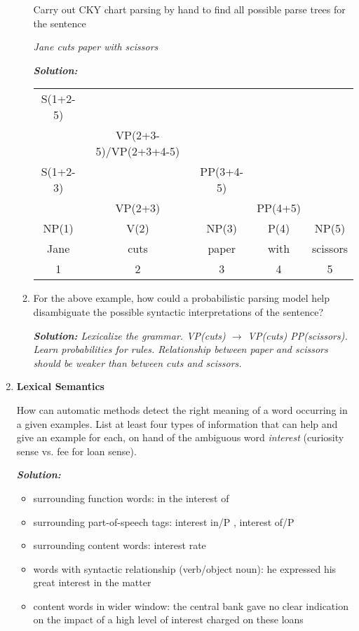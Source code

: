 \documentclass[12pt]{article}
\begin{document}
\begin{enumerate}
\begin{enumerate}
Carry out CKY chart parsing by hand to find all possible parse trees for the sentence
\begin{center}
\em Jane cuts paper with scissors
\end{center}

{\em{\bf  Solution:} 

\begin{tabular}{ccccc}
S(1+2-5)\\
&VP(2+3-5)/VP(2+3+4-5)\\
S(1+2-3)&&PP(3+4-5)\\
&VP(2+3)&&PP(4+5)\\
NP(1) & V(2) & NP(3) & P(4) & NP(5) \\
Jane & cuts & paper & with & scissors\\
1&2&3&4&5\\
\end{tabular}} 

\item For  the above example, how could a probabilistic parsing model help disambiguate the possible syntactic interpretations of the sentence?

{\em{\bf  Solution:} Lexicalize the grammar. VP(cuts) $\rightarrow$ VP(cuts) PP(scissors). Learn probabilities for rules. Relationship between paper and scissors should be weaker than between cuts and scissors.} 

\end{enumerate}

\newpage 
\item {\bf Lexical Semantics}

How can automatic methods detect the right meaning of a word occurring in a given examples. List at least four types of information that can help and give an example for each, on hand of the ambiguous word {\em interest} (curiosity sense vs. fee for loan sense).

{\em{\bf  Solution:} \begin{itemize}
\item surrounding function words: in the interest of
\item surrounding part-of-speech tags: interest in/P , interest of/P
\item surrounding content words: interest rate
\item words with syntactic relationship (verb/object noun): he expressed his great interest in the matter
\item content words in wider window: the central bank gave no clear indication on the impact of a high level of interest charged on these loans
\end{itemize}
}

\end{enumerate}
\end{document}

